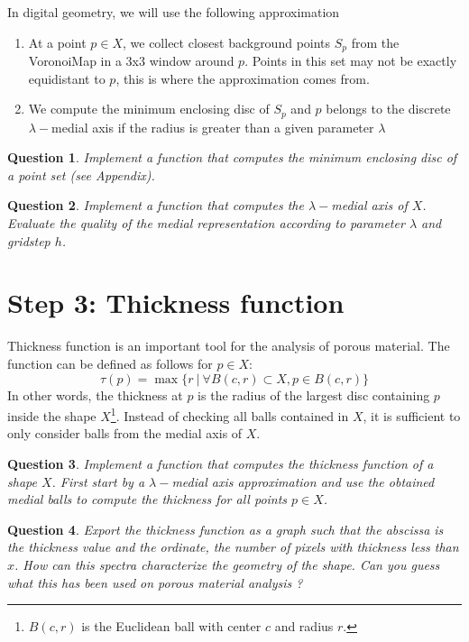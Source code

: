 \documentclass[a4paper, 11pt]{article}
\newtheorem{qu}{Question}
\begin{document}
In digital geometry, we will use the following approximation
\begin{enumerate}
\item At a point $p\in X$, we collect closest background points $S_p$
  from the VoronoiMap in a 3x3 window around $p$. Points in this set
  may not be exactly equidistant to $p$, this is where the approximation comes
  from.
\item We compute the minimum enclosing disc of $S_p$ and $p$ belongs
  to   the discrete $\lambda-$medial axis if the radius is greater
  than a given parameter $\lambda$
\end{enumerate}


\begin{qu}
  Implement a function that computes the minimum enclosing disc of a
  point set (see Appendix).
\end{qu}



\begin{qu}
  Implement a function that computes the $\lambda-$medial axis of
  $X$. Evaluate the quality of the medial representation according to
  parameter $\lambda$ and gridstep $h$.
\end{qu}

\section{Step 3: Thickness function}

Thickness function is an important tool for the analysis of porous
material. The function can be defined as follows for $p\in X$:
\begin{equation}
  \tau(p) = \max \{ r~|~ \forall B(c,r)\subset X, p\in
  B(c,r)\}
\end{equation}
In other words, the thickness at $p$ is the radius of the largest
disc containing $p$ inside the shape $X$\footnote{$B(c,r)$ is the Euclidean ball with center $c$ and
    radius $r$.}. Instead of checking all
balls contained in $X$, it is sufficient to only consider balls from
the medial axis of $X$.

\begin{qu}
  Implement a function that computes the thickness function of a shape
  $X$. First start by a $\lambda-$medial axis approximation and  use
  the obtained medial balls to compute the thickness for all points
  $p\in X$.
\end{qu}


\begin{qu}
  Export the thickness function as a graph such that  the abscissa is the
  thickness value and the ordinate, the number of pixels with
  thickness less than $x$. How can this spectra characterize the
  geometry of the shape. Can you guess what this has been used on
  porous material analysis ?
\end{qu}
\end{document}
